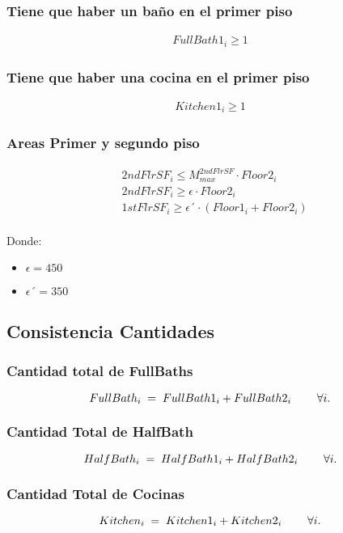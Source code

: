 \documentclass{article}
\begin{document}
\subsubsection{Tiene que haber un baño en el primer piso}
\begin{align}
    FullBath1_{i}\geq 1
\end{align}

\subsubsection{Tiene que haber una cocina en el primer piso}
\begin{align}
    Kitchen1_{i}\geq 1
\end{align}

\subsubsection{Areas Primer y segundo piso}
\begin{align}
    &2ndFlrSF_{i}\leq M_{max}^{2ndFlrSF} \cdot Floor2_{i}\\
    &2ndFlrSF_{i}\geq \epsilon \cdot Floor2_{i}\\
    &1stFlrSF_{i}\geq \epsilon´\cdot (Floor1_{i}+Floor2_{i})
\end{align}\\
Donde:
\begin{itemize}
    \item $\epsilon=450$
    \item $\epsilon ´=350$
\end{itemize}
\subsection{Consistencia Cantidades}
\subsubsection{Cantidad total de FullBaths}
    \[
FullBath_i \;=\; FullBath1_i + FullBath2_i \hspace{8mm} \forall i.
\]
\subsubsection{Cantidad Total de HalfBath}
    \[
HalfBath_i \;=\; HalfBath1_i + HalfBath2_i \hspace{8mm} \forall i.
\]

\subsubsection{Cantidad Total de Cocinas}
\[
Kitchen_i \;=\; Kitchen1_i + Kitchen2_i \hspace{8mm} \forall i.
\]
\end{document}
